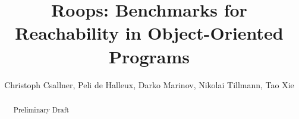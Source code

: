\documentclass{article}
\title{Roops: Benchmarks for\\Reachability in Object-Oriented Programs}
\author{Christoph Csallner, Peli de Halleux, Darko Marinov, Nikolai Tillmann, Tao Xie}
\begin{document}
\maketitle

\begin{abstract}
Preliminary Draft
\end{abstract}





\appendix





\end{document}
